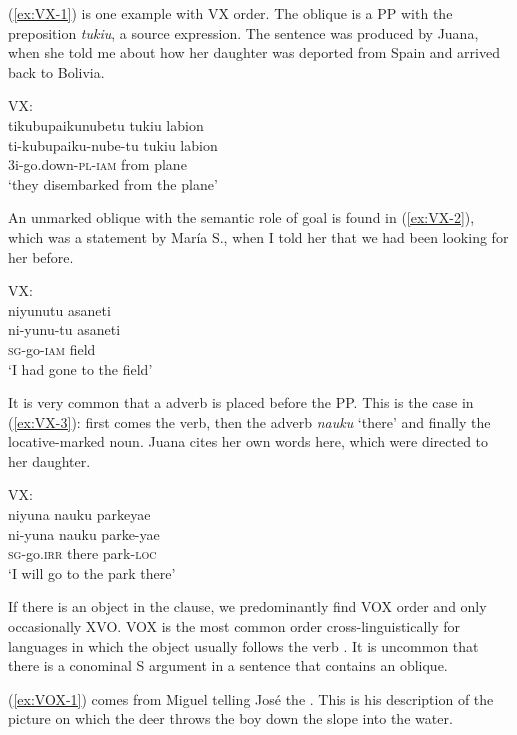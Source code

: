 (\ref{ex:VX-1}) is one example with VX order. The oblique is a PP with the preposition \textit{tukiu}, a source expression. The sentence was produced by Juana, when she told me about how her daughter was deported from Spain and arrived back to Bolivia.

\ea\label{ex:VX-1}
\begingl
\glpreamble \textup{VX:}\\tikubupaikunubetu tukiu labion\\
\gla ti-kubupaiku-nube-tu tukiu labion\\
\glb 3i-go.down-\textsc{pl}-\textsc{iam} from plane\\
\glft ‘they disembarked from the plane’
\endgl
\trailingcitation{[jxx-p120430l-1.266]}
\xe

An unmarked oblique with the semantic role of goal is found in (\ref{ex:VX-2}), which was a statement by María S., when I told her that we had been looking for her before.

\ea\label{ex:VX-2}
\begingl
\glpreamble \textup{VX:}\\niyunutu asaneti\\
\gla ni-yunu-tu asaneti\\
\textsc{sg}-go-\textsc{iam} field\\
\glft ‘I had gone to the field’
\endgl
\trailingcitation{[mrx-c120509l.052]}
\xe

It is very common that a  adverb is placed before the PP. This is the case in (\ref{ex:VX-3}): first comes the verb, then the adverb \textit{nauku} ‘there’ and finally the locative-marked noun. Juana cites her own words here, which were directed to her daughter. 

\ea\label{ex:VX-3}
\begingl
\glpreamble \textup{VX:}\\niyuna nauku parkeyae\\
\gla ni-yuna nauku parke-yae\\
\textsc{sg}-go.\textsc{irr} there park-\textsc{loc}\\
\glft ‘I will go to the park there’
\endgl
\trailingcitation{[jxx-p120430l-2.242]}
\xe

If there is an object in the clause, we predominantly find VOX order and only occasionally XVO. VOX is the most common order cross-linguistically for languages in which the object usually follows the verb \citep[]{wals-84}. It is uncommon that there is a conominal S argument in a sentence that contains an oblique.

(\ref{ex:VOX-1}) comes from Miguel telling José the . This is his description of the picture on which the deer throws the boy down the slope into the water.

